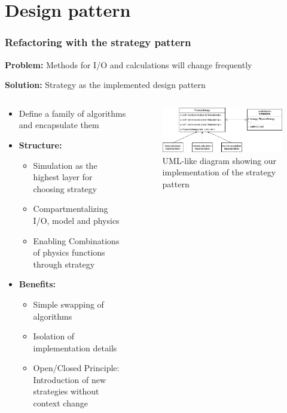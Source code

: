 \section{Design pattern}

\begin{frame}
    \frametitle{Refactoring with the strategy pattern}
    \textbf{Problem:} Methods for I/O and calculations will change frequently

    \textbf{Solution:} Strategy as the implemented design pattern

    \begin{columns}
        \hspace{-25pt}
        \begin{column}{0.55\textwidth}
            \begin{itemize}
                \item Define a family of algorithms and encapsulate them
                \item \textbf{Structure: } 
                \begin{itemize}
                    \item Simulation as the highest layer for choosing strategy
                    \item Compartmentalizing I/O, model and physics
                    \item Enabling Combinations of physics functions through strategy
                \end{itemize}
                \item \textbf{Benefits: }
                \begin{itemize}
                    \item Simple swapping of algorithms
                    \item Isolation of implementation details
                    \item Open/Closed Principle: Introduction of new strategies without context change
                \end{itemize}
            \end{itemize}
        \end{column}
        \hspace{-40pt}
        \begin{column}{0.55\textwidth}
            \begin{figure}
                \includegraphics[width=\columnwidth]{../../../report/report1/res/strategy.png}
                \caption{UML-like diagram showing our implementation of the strategy pattern}
            \end{figure}
        \end{column}
    \end{columns}

    
\end{frame}